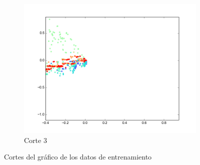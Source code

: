 \begin{figure}[H]
\begin{subfigure}[b]{0.33\textwidth}
                \includegraphics[width=\linewidth]{secciones/graficos/sanger/eje3_train.png}
                \caption{Corte 3}
                \label{fig: ej1_sanger_eje_3_train}
        \end{subfigure}
        \caption{Cortes del gráfico de los datos de entrenamiento}
        \label{fig: ej1_sanger_ejes_train}
\end{figure}


